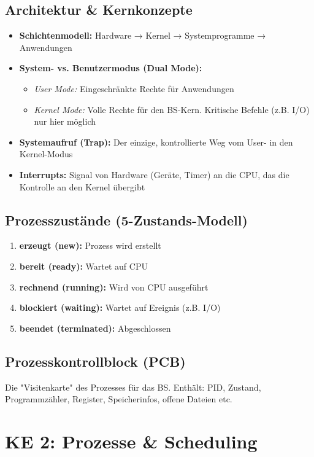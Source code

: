 \documentclass[9pt,a4paper]{extarticle}
\begin{document}
\begin{multicols*}{2}
\subsection{Architektur \& Kernkonzepte}
\begin{itemize}
\item \textbf{Schichtenmodell:} Hardware → Kernel → Systemprogramme → Anwendungen
\item \textbf{System- vs. Benutzermodus (Dual Mode):}
  \begin{itemize}
  \item \textit{User Mode:} Eingeschränkte Rechte für Anwendungen
  \item \textit{Kernel Mode:} Volle Rechte für den BS-Kern. Kritische Befehle (z.B. I/O) nur hier möglich
  \end{itemize}
\item \textbf{Systemaufruf (Trap):} Der einzige, kontrollierte Weg vom User- in den Kernel-Modus
\item \textbf{Interrupts:} Signal von Hardware (Geräte, Timer) an die CPU, das die Kontrolle an den Kernel übergibt
\end{itemize}

\subsection{Prozesszustände (5-Zustands-Modell)}
\begin{enumerate}
\item \textbf{erzeugt (new):} Prozess wird erstellt
\item \textbf{bereit (ready):} Wartet auf CPU
\item \textbf{rechnend (running):} Wird von CPU ausgeführt
\item \textbf{blockiert (waiting):} Wartet auf Ereignis (z.B. I/O)
\item \textbf{beendet (terminated):} Abgeschlossen
\end{enumerate}

\subsection{Prozesskontrollblock (PCB)}
Die "Visitenkarte" des Prozesses für das BS. Enthält: PID, Zustand, Programmzähler, Register, Speicherinfos, offene Dateien etc.

\section{KE 2: Prozesse \& Scheduling}


\end{multicols*}
\end{document}
